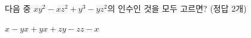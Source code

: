 다음 중 $xy^2-xz^2+y^3-yz^2$의 인수인 것을 모두 고르면? (정답 2개)
\begin{choices32}{$x-y$}{$x+y$}{$x+z$}{$y-z$}{$z-x$}\end{choices32}
